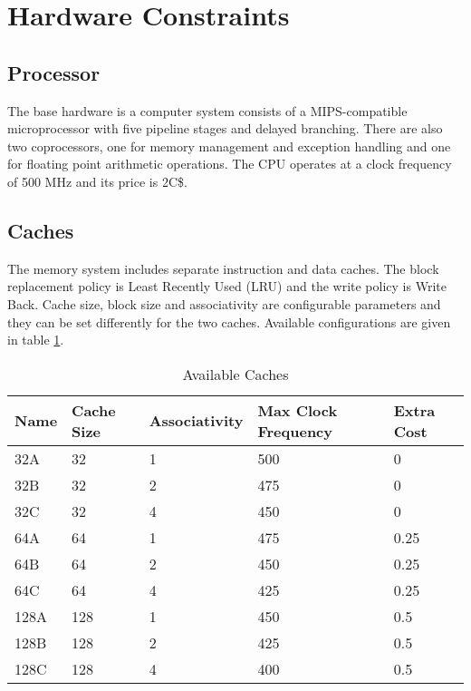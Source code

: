 
\renewcommand\thesection{\Alph{section}}
\setcounter{section}{0}
\section{Hardware Constraints}
\label{sec:hardware_constaints}

\subsection{Processor}
The base hardware is a computer system consists of a MIPS-compatible microprocessor with five pipeline 
stages and delayed branching. There are also two coprocessors, one for memory 
management and exception handling and one for floating point 
arithmetic operations.
The CPU operates at a clock frequency of 500 MHz and its price is 2C\$. 
\subsection{Caches}
The memory system includes separate instruction and data caches. The block 
replacement policy is Least Recently Used (LRU) and the write policy is Write Back. 
Cache size, block size and associativity are 
configurable parameters and they can be set differently for the two caches. Available 
configurations are given in table \ref{cache_table}.
\begin{table}[h]
	\centering
	\begin{tabular}{|l|l|l|l|l|} \hline
        Name & Cache Size & Associativity & Max Clock Frequency & Extra Cost        \\ \hline\hline
        32A &32	& 1	& 500	& 0        \\ \hline
        32B &32	& 2	& 475	& 0        \\ \hline
        32C &32	& 4	& 450	& 0        \\ \hline
        64A &64	& 1	& 475	& 0.25        \\ \hline
        64B &64	& 2	& 450	& 0.25        \\ \hline
        64C &64	& 4	& 425	& 0.25        \\ \hline
        128A &128	& 1	& 450	& 0.5        \\ \hline
        128B &128	& 2	& 425	& 0.5        \\ \hline
        128C &128	& 4	& 400	& 0.5        \\ \hline
	\end{tabular}
	\caption{Available Caches}
	\label{cache_table}
\end{table}
